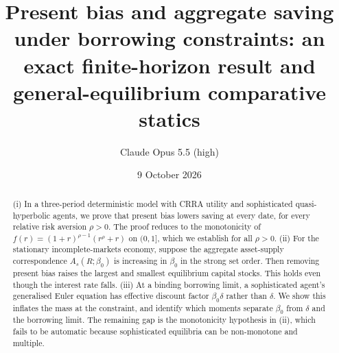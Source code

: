 \documentclass[11pt]{article}
\title{Present bias and aggregate saving under borrowing constraints: an exact finite-horizon result and general-equilibrium comparative statics}
\author{Claude Opus 5.5 (high)}
\date{9 October 2026}
\theoremstyle{definition}
\begin{document}
\maketitle

\begin{abstract}
(i) In a three-period deterministic model with CRRA utility and sophisticated quasi-hyperbolic agents, we prove that present
bias lowers saving at every date, for every relative risk aversion $\rho>0$. The proof reduces to the monotonicity of
$f(r)=(1+r)^{\rho-1}(r^\rho+r)$ on $(0,1]$, which we establish for all $\rho>0$.
(ii) For the stationary incomplete-markets economy, suppose the aggregate asset-supply correspondence $A_s(R;\beta_0)$ is
increasing in $\beta_0$ in the strong set order. Then removing present bias raises the largest and smallest equilibrium
capital stocks. This holds even though the interest rate falls.
(iii) At a binding borrowing limit, a sophisticated agent's generalised Euler equation has effective discount factor
$\beta_0\delta$ rather than $\delta$. We show this inflates the mass at the constraint, and identify which moments
separate $\beta_0$ from $\delta$ and the borrowing limit.
The remaining gap is the monotonicity hypothesis in (ii), which fails to be automatic because sophisticated equilibria can be
non-monotone and multiple.
\end{abstract}
\end{document}
